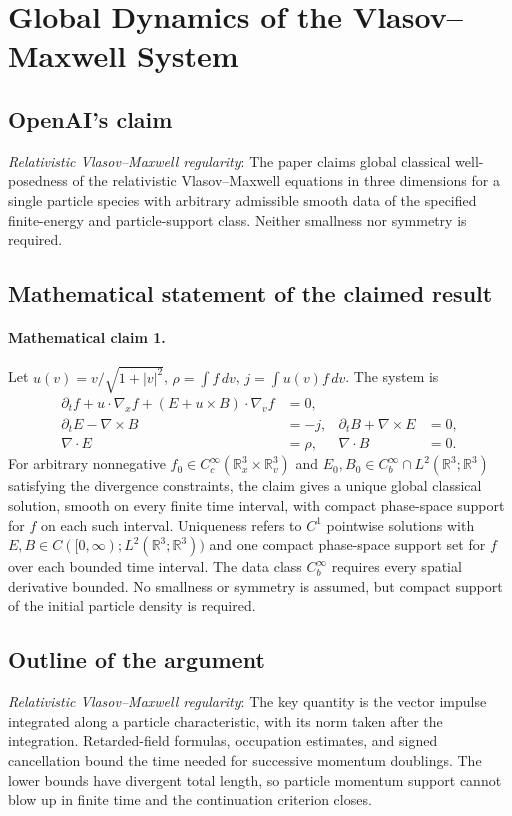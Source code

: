 \documentclass[11pt]{article}
\begin{document}
\section*{Global Dynamics of the Vlasov–Maxwell System}

\subsection{OpenAI's claim}
\textit{Relativistic Vlasov--Maxwell regularity}: The paper claims global classical well-posedness of the relativistic Vlasov--Maxwell equations in three dimensions for a single particle species with arbitrary admissible smooth data of the specified finite-energy and particle-support class. Neither smallness nor symmetry is required.

\subsection{Mathematical statement of the claimed result}
\paragraph{Mathematical claim 1.} Let $u(v)=v/\sqrt{1+|v|^2}$, $\rho=\int f\,dv$, $j=\int u(v)f\,dv$. The system is \[\begin{aligned}\partial_tf+u\cdot\nabla_xf+(E+u\times B)\cdot\nabla_vf&=0,\\\partial_tE-\nabla\times B&=-j,&\partial_tB+\nabla\times E&=0,\\\nabla\cdot E&=\rho,&\nabla\cdot B&=0.\end{aligned}\] For arbitrary nonnegative $f_0\in C_c^\infty(\mathbb R_x^3\times\mathbb R_v^3)$ and $E_0,B_0\in C_b^\infty\cap L^2(\mathbb R^3;\mathbb R^3)$ satisfying the divergence constraints, the claim gives a unique global classical solution, smooth on every finite time interval, with compact phase-space support for $f$ on each such interval. Uniqueness refers to $C^1$ pointwise solutions with $E,B\in C([0,\infty);L^2(\mathbb R^3;\mathbb R^3))$ and one compact phase-space support set for $f$ over each bounded time interval. The data class $C_b^\infty$ requires every spatial derivative bounded. No smallness or symmetry is assumed, but compact support of the initial particle density is required.

\subsection{Outline of the argument}
\textit{Relativistic Vlasov--Maxwell regularity}: The key quantity is the vector impulse integrated along a particle characteristic, with its norm taken after the integration. Retarded-field formulas, occupation estimates, and signed cancellation bound the time needed for successive momentum doublings. The lower bounds have divergent total length, so particle momentum support cannot blow up in finite time and the continuation criterion closes.
\end{document}
